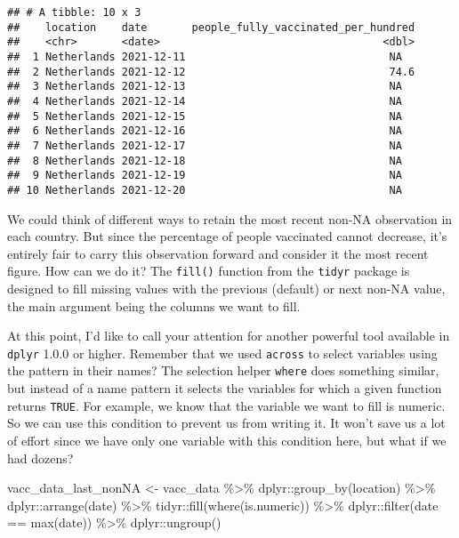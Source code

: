 \documentclass[
]{book}
\newenvironment{Shaded}{\begin{snugshade}}{\end{snugshade}}
\newcommand{\FunctionTok}[1]{\textcolor[rgb]{0.00,0.00,0.00}{#1}}
\newcommand{\NormalTok}[1]{#1}
\newcommand{\OtherTok}[1]{\textcolor[rgb]{0.56,0.35,0.01}{#1}}
\newcommand{\SpecialCharTok}[1]{\textcolor[rgb]{0.00,0.00,0.00}{#1}}
\begin{document}
\begin{verbatim}
## # A tibble: 10 x 3
##    location    date       people_fully_vaccinated_per_hundred
##    <chr>       <date>                                   <dbl>
##  1 Netherlands 2021-12-11                                NA  
##  2 Netherlands 2021-12-12                                74.6
##  3 Netherlands 2021-12-13                                NA  
##  4 Netherlands 2021-12-14                                NA  
##  5 Netherlands 2021-12-15                                NA  
##  6 Netherlands 2021-12-16                                NA  
##  7 Netherlands 2021-12-17                                NA  
##  8 Netherlands 2021-12-18                                NA  
##  9 Netherlands 2021-12-19                                NA  
## 10 Netherlands 2021-12-20                                NA
\end{verbatim}

We could think of different ways to retain the most recent non-NA observation in each country. But since the percentage of people vaccinated cannot decrease, it's entirely fair to carry this observation forward and consider it the most recent figure. How can we do it? The \texttt{fill()} function from the \texttt{tidyr} package is designed to fill missing values with the previous (default) or next non-NA value, the main argument being the columns we want to fill.

At this point, I'd like to call your attention for another powerful tool available in \texttt{dplyr} 1.0.0 or higher. Remember that we used \texttt{across} to select variables using the pattern in their names? The selection helper \texttt{where} does something similar, but instead of a name pattern it selects the variables for which a given function returns \texttt{TRUE}. For example, we know that the variable we want to fill is numeric. So we can use this condition to prevent us from writing it. It won't save us a lot of effort since we have only one variable with this condition here, but what if we had dozens?

\begin{Shaded}
\begin{Highlighting}[]
\NormalTok{vacc\_data\_last\_nonNA }\OtherTok{\textless{}{-}}\NormalTok{ vacc\_data }\SpecialCharTok{\%\textgreater{}\%} 
\NormalTok{  dplyr}\SpecialCharTok{::}\FunctionTok{group\_by}\NormalTok{(location) }\SpecialCharTok{\%\textgreater{}\%} 
\NormalTok{  dplyr}\SpecialCharTok{::}\FunctionTok{arrange}\NormalTok{(date) }\SpecialCharTok{\%\textgreater{}\%} 
\NormalTok{  tidyr}\SpecialCharTok{::}\FunctionTok{fill}\NormalTok{(}\FunctionTok{where}\NormalTok{(is.numeric)) }\SpecialCharTok{\%\textgreater{}\%} 
\NormalTok{  dplyr}\SpecialCharTok{::}\FunctionTok{filter}\NormalTok{(date }\SpecialCharTok{==} \FunctionTok{max}\NormalTok{(date)) }\SpecialCharTok{\%\textgreater{}\%} 
\NormalTok{  dplyr}\SpecialCharTok{::}\FunctionTok{ungroup}\NormalTok{()}
\end{Highlighting}
\end{Shaded}
\end{document}
